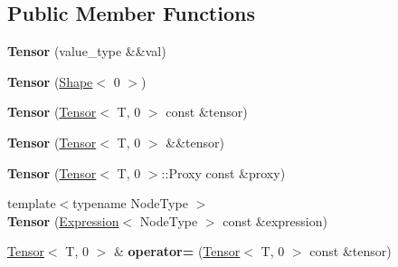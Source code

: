 \subsection*{Public Member Functions}
\begin{DoxyCompactItemize}
\item 
{\bfseries Tensor} (value\+\_\+type \&\&val)\hypertarget{classtensor_1_1Tensor_3_01T_00_010_01_4_a92889af2f880713dae2e232821aa6ae7}{}\label{classtensor_1_1Tensor_3_01T_00_010_01_4_a92889af2f880713dae2e232821aa6ae7}

\item 
{\bfseries Tensor} (\hyperlink{classtensor_1_1Shape}{Shape}$<$ 0 $>$)\hypertarget{classtensor_1_1Tensor_3_01T_00_010_01_4_abd698012d36bc78195d567f98156607f}{}\label{classtensor_1_1Tensor_3_01T_00_010_01_4_abd698012d36bc78195d567f98156607f}

\item 
{\bfseries Tensor} (\hyperlink{classtensor_1_1Tensor}{Tensor}$<$ T, 0 $>$ const \&tensor)\hypertarget{classtensor_1_1Tensor_3_01T_00_010_01_4_aa06071f3f70e54c655b8f1867158075d}{}\label{classtensor_1_1Tensor_3_01T_00_010_01_4_aa06071f3f70e54c655b8f1867158075d}

\item 
{\bfseries Tensor} (\hyperlink{classtensor_1_1Tensor}{Tensor}$<$ T, 0 $>$ \&\&tensor)\hypertarget{classtensor_1_1Tensor_3_01T_00_010_01_4_afeedc5739fa083111fbfaa3f1ea53076}{}\label{classtensor_1_1Tensor_3_01T_00_010_01_4_afeedc5739fa083111fbfaa3f1ea53076}

\item 
{\bfseries Tensor} (\hyperlink{classtensor_1_1Tensor}{Tensor}$<$ T, 0 $>$\+::Proxy const \&proxy)\hypertarget{classtensor_1_1Tensor_3_01T_00_010_01_4_a47f69ae11220abf2f985ad4bc04f05be}{}\label{classtensor_1_1Tensor_3_01T_00_010_01_4_a47f69ae11220abf2f985ad4bc04f05be}

\item 
{\footnotesize template$<$typename Node\+Type $>$ }\\{\bfseries Tensor} (\hyperlink{structtensor_1_1Expression}{Expression}$<$ Node\+Type $>$ const \&expression)\hypertarget{classtensor_1_1Tensor_3_01T_00_010_01_4_abeb4536a1e5be05f73105ae24fa73c0a}{}\label{classtensor_1_1Tensor_3_01T_00_010_01_4_abeb4536a1e5be05f73105ae24fa73c0a}

\item 
\hyperlink{classtensor_1_1Tensor}{Tensor}$<$ T, 0 $>$ \& {\bfseries operator=} (\hyperlink{classtensor_1_1Tensor}{Tensor}$<$ T, 0 $>$ const \&tensor)\hypertarget{classtensor_1_1Tensor_3_01T_00_010_01_4_ac47f68b8711e0ac193be28ad39c61dbf}{}\label{classtensor_1_1Tensor_3_01T_00_010_01_4_ac47f68b8711e0ac193be28ad39c61dbf}


\end{DoxyCompactItemize}

